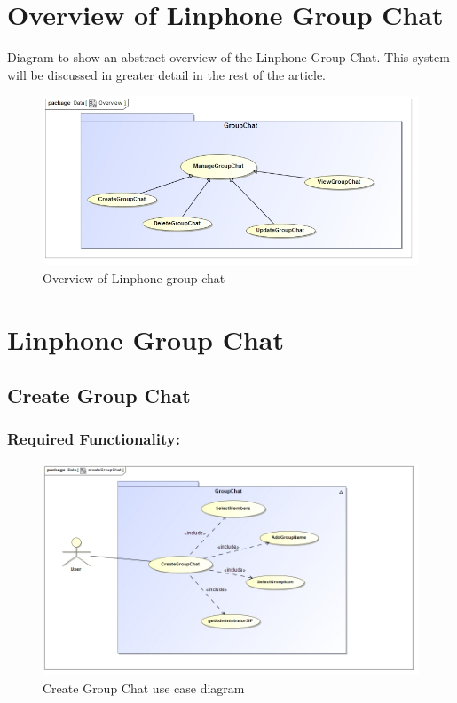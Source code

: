 \documentclass[a4paper]{article}
\begin{document}
\section{\textbf{\huge{Overview of Linphone Group Chat}}}
\large{Diagram to show an abstract overview of the Linphone Group Chat. This system will be discussed in greater detail in the rest of the article.}\\
\begin{figure}[H]
\centering
\includegraphics[width=1\linewidth]{./pictures/Overview.jpg}
\caption{Overview of Linphone group chat}
\end{figure}
\newpage


\section{\textbf{\huge{Linphone Group Chat}}}

\subsection{Create Group Chat}
\subsubsection{Required Functionality:} 
\begin{figure}[H]
\includegraphics[width=1\linewidth]{./pictures/createGroupChat.jpg}
\caption{Create Group Chat use case diagram}
\end{figure}
\end{document}
